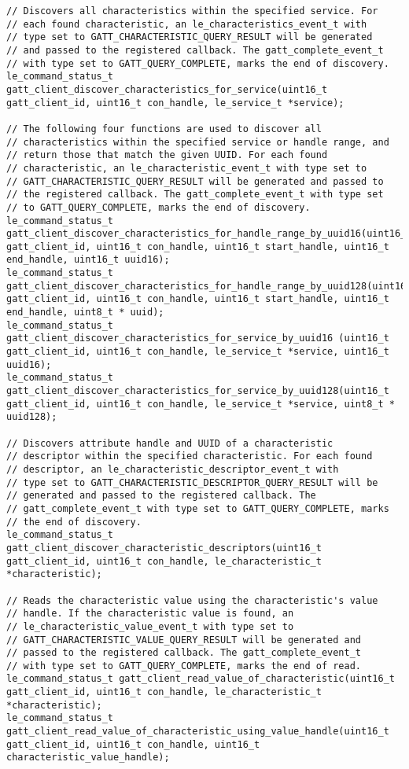 \begin{lstlisting}
// Discovers all characteristics within the specified service. For
// each found characteristic, an le_characteristics_event_t with 
// type set to GATT_CHARACTERISTIC_QUERY_RESULT will be generated 
// and passed to the registered callback. The gatt_complete_event_t 
// with type set to GATT_QUERY_COMPLETE, marks the end of discovery.
le_command_status_t gatt_client_discover_characteristics_for_service(uint16_t gatt_client_id, uint16_t con_handle, le_service_t *service);

// The following four functions are used to discover all 
// characteristics within the specified service or handle range, and 
// return those that match the given UUID. For each found
// characteristic, an le_characteristic_event_t with type set to   
// GATT_CHARACTERISTIC_QUERY_RESULT will be generated and passed to 
// the registered callback. The gatt_complete_event_t with type set
// to GATT_QUERY_COMPLETE, marks the end of discovery.
le_command_status_t gatt_client_discover_characteristics_for_handle_range_by_uuid16(uint16_t gatt_client_id, uint16_t con_handle, uint16_t start_handle, uint16_t end_handle, uint16_t uuid16);
le_command_status_t gatt_client_discover_characteristics_for_handle_range_by_uuid128(uint16_t gatt_client_id, uint16_t con_handle, uint16_t start_handle, uint16_t end_handle, uint8_t * uuid);
le_command_status_t gatt_client_discover_characteristics_for_service_by_uuid16 (uint16_t gatt_client_id, uint16_t con_handle, le_service_t *service, uint16_t  uuid16);
le_command_status_t gatt_client_discover_characteristics_for_service_by_uuid128(uint16_t gatt_client_id, uint16_t con_handle, le_service_t *service, uint8_t * uuid128);

// Discovers attribute handle and UUID of a characteristic 
// descriptor within the specified characteristic. For each found
// descriptor, an le_characteristic_descriptor_event_t with 
// type set to GATT_CHARACTERISTIC_DESCRIPTOR_QUERY_RESULT will be  
// generated and passed to the registered callback. The  
// gatt_complete_event_t with type set to GATT_QUERY_COMPLETE, marks 
// the end of discovery.
le_command_status_t gatt_client_discover_characteristic_descriptors(uint16_t gatt_client_id, uint16_t con_handle, le_characteristic_t *characteristic);

// Reads the characteristic value using the characteristic's value
// handle. If the characteristic value is found, an 
// le_characteristic_value_event_t with type set to 
// GATT_CHARACTERISTIC_VALUE_QUERY_RESULT will be generated and
// passed to the registered callback. The gatt_complete_event_t 
// with type set to GATT_QUERY_COMPLETE, marks the end of read.
le_command_status_t gatt_client_read_value_of_characteristic(uint16_t gatt_client_id, uint16_t con_handle, le_characteristic_t *characteristic);
le_command_status_t gatt_client_read_value_of_characteristic_using_value_handle(uint16_t gatt_client_id, uint16_t con_handle, uint16_t characteristic_value_handle);


\end{lstlisting}
